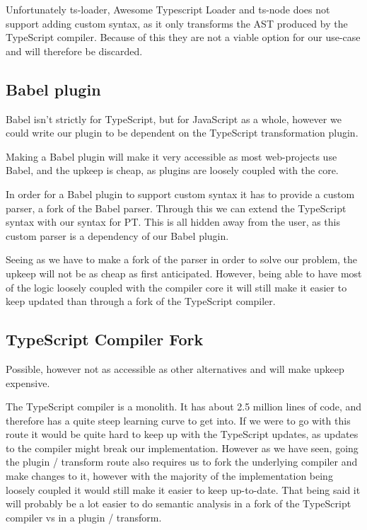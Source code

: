 Unfortunately ts-loader, Awesome Typescript Loader and ts-node does not support adding custom syntax, as it only transforms the AST produced by the TypeScript compiler.
Because of this they are not a viable option for our use-case and will therefore be discarded.

\subsection{Babel plugin}\label{subsec:babel-plugin}

Babel isn't strictly for TypeScript, but for JavaScript as a whole, however we could write our plugin to be dependent on the TypeScript transformation plugin.

Making a Babel plugin will make it very accessible as most web-projects use Babel, and the upkeep is cheap, as plugins are loosely coupled with the core.

In order for a Babel plugin to support custom syntax it has to provide a custom parser, a fork of the Babel parser.
Through this we can extend the TypeScript syntax with our syntax for PT.
This is all hidden away from the user, as this custom parser is a dependency of our Babel plugin.

Seeing as we have to make a fork of the parser in order to solve our problem, the upkeep will not be as cheap as first anticipated.
However, being able to have most of the logic loosely coupled with the compiler core it will still make it easier to keep updated than through a fork of the TypeScript compiler.


\subsection{TypeScript Compiler Fork}\label{subsec:typescript-compiler-fork}

Possible, however not as accessible as other alternatives and will make upkeep expensive.

The TypeScript compiler is a monolith.
It has about 2.5 million lines of code, and therefore has a quite steep learning curve to get into.
If we were to go with this route it would be quite hard to keep up with the TypeScript updates, as updates to the compiler might break our implementation.
However as we have seen, going the plugin / transform route also requires us to fork the underlying compiler and make changes to it, however with the majority of the implementation being loosely coupled it would still make it easier to keep up-to-date.
That being said it will probably be a lot easier to do semantic analysis in a fork of the TypeScript compiler vs in a plugin / transform.
